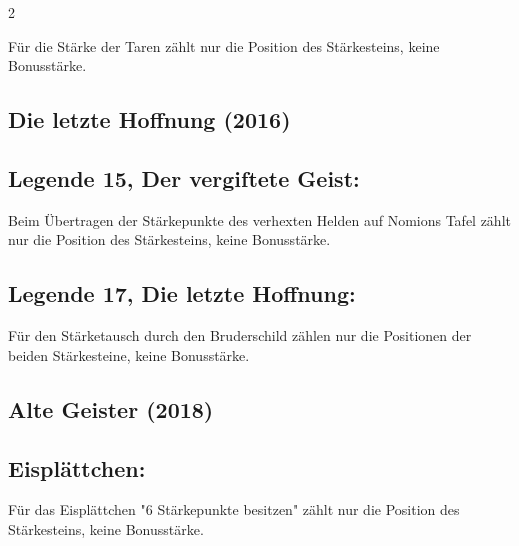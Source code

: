 \documentclass[10pt, a4paper, oneside]{book}
\begin{document}
\begin{multicols*}{2}
\begin{bgcolor}
Für die Stärke der Taren zählt nur die Position des Stärkesteins, keine Bonusstärke.
\supercite{DRidN10:Taren}

\end{bgcolor}





\begin{bgcolor}
\section{Die letzte Hoffnung (2016)}


\subsection{Legende 15, Der vergiftete Geist:}

Beim Übertragen der Stärkepunkte des verhexten Helden auf Nomions Tafel zählt nur die Position des Stärkesteins, keine Bonusstärke.
\supercite{DlH15:Enttarnt}


\subsection{Legende 17, Die letzte Hoffnung:}

Für den Stärketausch durch den Bruderschild zählen nur die Positionen der beiden Stärkesteine, keine Bonusstärke.
\supercite{DH:Begleitheft}

\end{bgcolor}




\begin{bgcolor}[color-AG]
\section{Alte Geister (2018)}

\subsection{Eisplättchen:}

Für das Eisplättchen "6 Stärkepunkte besitzen" zählt nur die Position des Stärkesteins, keine Bonusstärke.
\supercite{AG:Begleitheft}

\end{bgcolor}



\end{multicols*}
\end{document}
